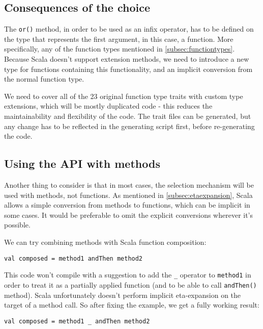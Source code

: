 \subsection{Consequences of the choice}

The \lstinline|or()| method, in order to be used as an infix operator, has to be defined on the type that represents the first argument, in this case, a function. More specifically, any of the function types mentioned in \ref{subsec:functiontypes}. Because Scala doesn't support extension methods, we need to introduce a new type for functions containing this functionality, and an implicit conversion from the normal function type.

We need to cover all of the 23 original function type traits with custom type extensions, which will be mostly duplicated code - this reduces the maintainability and flexibility of the code. The trait files can be generated, but any change has to be reflected in the generating script first, before re-generating the code.

\subsection{Using the API with methods}
\label{subsec:apimethods}

Another thing to consider is that in most cases, the selection mechanism will be used with methods, not functions. As mentioned in \ref{subsec:etaexpansion}, Scala allows a simple conversion from methods to functions, which can be implicit in some cases. It would be preferable to omit the explicit conversions wherever it's possible.

We can try combining methods with Scala function composition:
\lstset{style=Scala}
\begin{lstlisting}
val composed = method1 andThen method2
\end{lstlisting}

This code won't compile with a suggestion to add the \lstinline|_| operator to \lstinline|method1| in order to treat it as a partially applied function (and to be able to call \lstinline|andThen()| method). Scala unfortunately doesn't perform implicit eta-expansion on the target of a method call. So after fixing the example, we get a fully working result:

\lstset{style=Scala}
\begin{lstlisting}
val composed = method1 _ andThen method2
\end{lstlisting}

